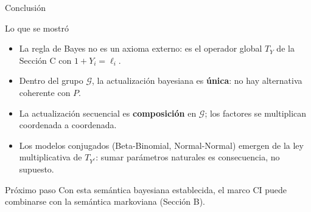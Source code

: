 \documentclass[12pt, aspectratio=169]{beamer}
\begin{document}
\begin{frame}{Conclusión}

  \begin{block}{Lo que se mostró}
    \begin{itemize}
      \item La regla de Bayes no es un axioma externo: es el operador global
            $T_Y$ de la Sección C con $1 + Y_i = \ell_i$.
      \item Dentro del grupo $\mathcal{G}$, la actualización bayesiana es
            \textbf{única}: no hay alternativa coherente con $P$.
      \item La actualización secuencial es \textbf{composición} en $\mathcal{G}$;
            los factores se multiplican coordenada a coordenada.
      \item Los modelos conjugados (Beta-Binomial, Normal-Normal) emergen
            de la ley multiplicativa de $T_{Y^\ell}$: sumar parámetros naturales
            es consecuencia, no supuesto.
    \end{itemize}
  \end{block}

  \vspace{8pt}
  \begin{alertblock}{Próximo paso}
    Con esta semántica bayesiana establecida, el marco CI puede combinarse
    con la semántica markoviana (Sección B).
  \end{alertblock}
\end{frame}

\end{document}
